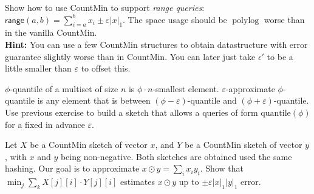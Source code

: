 \documentclass[12pt]{uebung}
\begin{document}
 


\renewcommand{\aufgname}{Exercise}

\begin{aufg}
Show how to use \textsf{CountMin} to support \emph{range queries}: $\textsf{range}(a,b) = \sum_{i=a}^b x_i \pm \varepsilon |x|_1$.
The space usage should be $\textrm{poly} \log$ worse than in the vanilla \textsf{CountMin}.\\
\textbf{Hint:} You can use a few \textsf{CountMin} structures to obtain datastructure with error guarantee slightly worse than in \textsf{CountMin}. You can later just take $\epsilon'$ to be a little smaller than $\varepsilon$ to offset this.
\end{aufg}

\begin{aufg}[Quantiles]
$\phi$-quantile of a multiset of size $n$ is $\phi \cdot n$-smallest element. $\varepsilon$-approximate $\phi$-quantile is any element that is between $(\phi-\varepsilon)$-quantile and $(\phi+\varepsilon)$-quantile. Use previous exercise to build a sketch that allows a queries of form $\textrm{quantile}(\phi)$ for a fixed in advance $\varepsilon$.
\end{aufg}


\begin{aufg}
Let $X$ be a \textsf{CountMin} sketch of vector $x$, and $Y$ be a \textsf{CountMin} sketch of vector $y$, with $x$ and $y$ being non-negative. Both sketches are obtained used the same hashing. Our goal is to approximate $x \odot y = \sum_i x_i y_i$. Show that $\min_j \sum_k X[j][i] \cdot Y[j][i]$ estimates $x \odot y$ up to $\pm \varepsilon |x|_1 |y|_1$ error.
\end{aufg}
\end{document}
